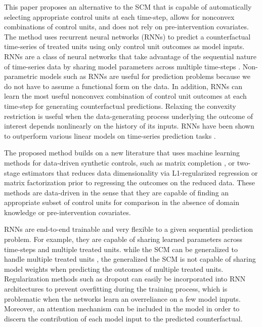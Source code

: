 \documentclass[hidelinks,12pt]{article}
\begin{document}
This paper proposes an alternative to the SCM that is capable of automatically selecting appropriate control units at each time-step, allows for nonconvex combinations of control units, and does not rely on pre-intervention covariates. The method uses recurrent neural networks (RNNs) to predict a counterfactual time-series of treated units using only control unit outcomes as model inputs. RNNs are a class of neural networks that take advantage of the sequential nature of time-series data by sharing model parameters across multiple time-steps \citep{el1995}. Non-parametric models such as RNNs are useful for prediction problems because we do not have to assume a functional form on the data. In addition, RNNs can learn the most useful nonconvex combination of control unit outcomes at each time-step for generating counterfactual predictions. Relaxing the convexity restriction is useful when the data-generating process underlying the outcome of interest depends nonlinearly on the history of its inputs. RNNs have been shown to outperform various linear models on time-series prediction tasks \citep{cinar2017position}. 

The proposed method builds on a new literature that uses machine learning methods for data-driven synthetic controls, such as matrix completion \citep{athey2017matrix,2019arXiv190308028P}, or two-stage estimators that reduces data dimensionality via L1-regularized regression \citep{doudchenko2016balancing,carvalho2018arco} or matrix factorization \citep{amjad2018robust} prior to regressing the outcomes on the reduced data. These methods are data-driven in the sense that they are capable of finding an appropriate subset of control units for comparison in the absence of domain knowledge or pre-intervention covariates. 

RNNs are end-to-end trainable and very flexible to a given sequential prediction problem. For example, they are capable of sharing learned parameters across time-steps and multiple treated units. while the SCM can be generalized to handle multiple treated units \citep[e.g.,][]{dube2015pooling,xu2017generalized}, the generalized the SCM is not capable of sharing model weights when predicting the outcomes of multiple treated units. Regularization methods such as dropout can easily be incorporated into RNN architectures to prevent overfitting during the training process, which is problematic when the networks learn an overreliance on a few model inputs. Moreover, an attention mechanism can be included in the model in order to discern the contribution of each model input to the predicted counterfactual. 
\end{document}
